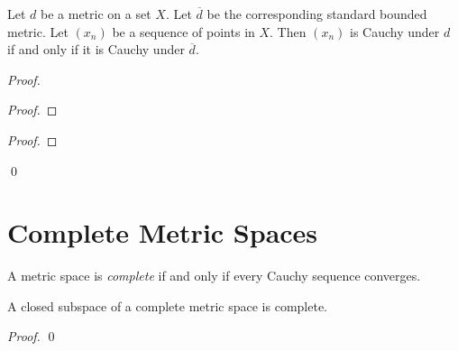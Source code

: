 \begin{proposition}
    \label{proposition:Cauchy_standard_bounded_metric}
    Let $d$ be a metric on a set $X$. Let $\overline{d}$ be the corresponding standard bounded metric.
    Let $(x_n)$ be a sequence of points in $X$. Then $(x_n)$ is Cauchy under $d$ if and only if
    it is Cauchy under $\overline{d}$.
\end{proposition}

\begin{proof}
    \pf
    \begin{proof}
    \end{proof}
    \begin{proof}
    \end{proof}
    \qed
\end{proof}

\section{Complete Metric Spaces}

\begin{definition}
    A metric space is \emph{complete} if and only if every Cauchy sequence converges.
\end{definition}

\begin{proposition}
    \label{proposition:closed_subspace_complete}
    A closed subspace of a complete metric space is complete.
\end{proposition}

\begin{proof}
    \pf
    \qed
\end{proof}

